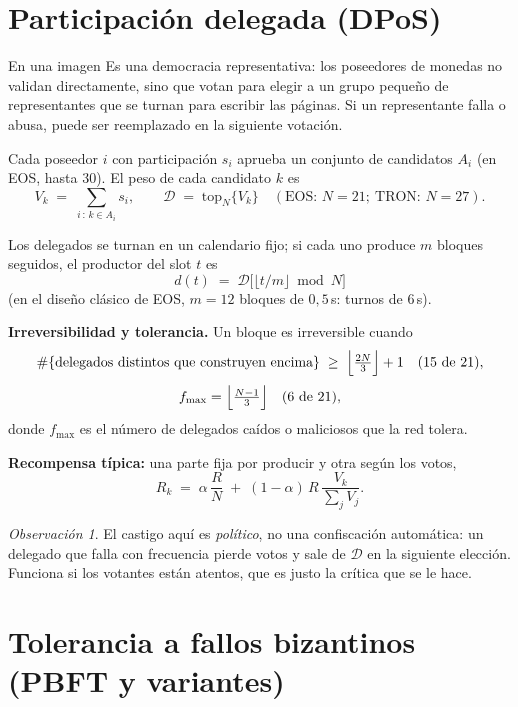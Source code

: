 \documentclass[11pt,a4paper]{article}
\theoremstyle{definition}
\theoremstyle{plain}
\theoremstyle{remark}
\newtheorem*{observacion}{Observación}
\begin{document}
\section{Participación delegada (DPoS)}\label{sec:dpos}

\begin{nota}{En una imagen}
Es una democracia representativa: los poseedores de monedas no validan
directamente, sino que votan para elegir a un grupo pequeño de representantes que
se turnan para escribir las páginas. Si un representante falla o abusa, puede ser
reemplazado en la siguiente votación.
\end{nota}

Cada poseedor $i$ con participación $s_i$ aprueba un conjunto de candidatos $A_i$
(en EOS, hasta 30). El peso de cada candidato $k$ es
\[
  V_k \;=\; \sum_{i\,:\,k \in A_i} s_i,
  \qquad
  \mathcal{D} \;=\; \mathrm{top}_N\{V_k\}
  \quad (\text{EOS: } N = 21;\ \text{TRON: } N = 27).
\]

Los delegados se turnan en un calendario fijo; si cada uno produce $m$ bloques
seguidos, el productor del slot $t$ es
\[
  d(t) \;=\; \mathcal{D}\bigl[\lfloor t/m \rfloor \bmod N\bigr]
\]
(en el diseño clásico de EOS, $m = 12$ bloques de $0{,}5$\,s: turnos de 6\,s).

\textbf{Irreversibilidad y tolerancia.} Un bloque es irreversible cuando
\[
  \#\{\text{delegados distintos que construyen encima}\}
  \;\ge\; \Bigl\lfloor \tfrac{2N}{3} \Bigr\rfloor + 1
  \quad (15 \text{ de } 21),
\]
\[
  f_{\max} = \Bigl\lfloor \tfrac{N-1}{3} \Bigr\rfloor \quad (6 \text{ de } 21),
\]
donde $f_{\max}$ es el número de delegados caídos o maliciosos que la red tolera.

\textbf{Recompensa típica:} una parte fija por producir y otra según los votos,
\[
  R_k \;=\; \alpha\,\frac{R}{N} \;+\; (1-\alpha)\,R\,\frac{V_k}{\sum_j V_j}.
\]

\begin{observacion}
El castigo aquí es \emph{político}, no una confiscación automática: un delegado
que falla con frecuencia pierde votos y sale de $\mathcal{D}$ en la siguiente
elección. Funciona si los votantes están atentos, que es justo la crítica que se
le hace.
\end{observacion}

\section{Tolerancia a fallos bizantinos (PBFT y variantes)}\label{sec:bft}
\end{document}

